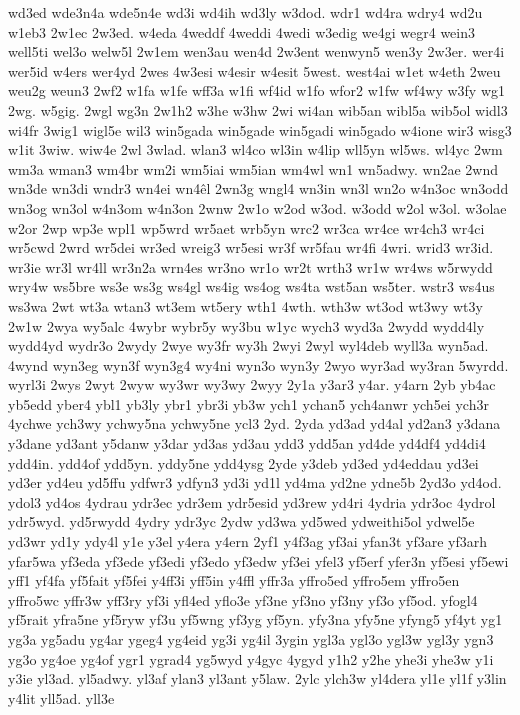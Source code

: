 {wd3ed
wde3n4a
wde5n4e
wd3i
wd4ih
wd3ly
w3dod.
wdr1
wd4ra
wdry4
wd2u
w1eb3
2w1ec
2w3ed.
w4eda
4weddf
4weddi
4wedi
w3edig
we4gi
wegr4
wein3
well5ti
wel3o
welw5l
2w1em
wen3au
wen4d
2w3ent
wenwyn5
wen3y
2w3er.
wer4i
wer5id
w4ers
wer4yd
2wes
4w3esi
w4esir
w4esit
5west.
west4ai
w1et
w4eth
2weu
weu2g
weun3
2wf2
w1fa
w1fe
wff3a
w1fi
wf4id
w1fo
wfor2
w1fw
wf4wy
w3fy
wg1
2wg.
w5gig.
2wgl
wg3n
2w1h2
w3he
w3hw
2wi
wi4an
wib5an
wibl5a
wib5ol
widl3
wi4fr
3wig1
wigl5e
wil3
win5gada
win5gade
win5gadi
win5gado
w4ione
wir3
wisg3
w1it
3wiw.
wiw4e
2wl
3wlad.
wlan3
wl4co
wl3in
w4lip
wll5yn
wl5ws.
wl4yc
2wm
wm3a
wman3
wm4br
wm2i
wm5iai
wm5ian
wm4wl
wn1
wn5adwy.
wn2ae
2wnd
wn3de
wn3di
wndr3
wn4ei
wn4êl
2wn3g
wngl4
wn3in
wn3l
wn2o
w4n3oc
wn3odd
wn3og
wn3ol
w4n3om
w4n3on
2wnw
2w1o
w2od
w3od.
w3odd
w2ol
w3ol.
w3olae
w2or
2wp
wp3e
wpl1
wp5wrd
wr5aet
wrb5yn
wrc2
wr3ca
wr4ce
wr4ch3
wr4ci
wr5cwd
2wrd
wr5dei
wr3ed
wreig3
wr5esi
wr3f
wr5fau
wr4fi
4wri.
wrid3
wr3id.
wr3ie
wr3l
wr4ll
wr3n2a
wrn4es
wr3no
wr1o
wr2t
wrth3
wr1w
wr4ws
w5rwydd
wry4w
ws5bre
ws3e
ws3g
ws4gl
ws4ig
ws4og
ws4ta
wst5an
ws5ter.
wstr3
ws4us
ws3wa
2wt
wt3a
wtan3
wt3em
wt5ery
wth1
4wth.
wth3w
wt3od
wt3wy
wt3y
2w1w
2wya
wy5alc
4wybr
wybr5y
wy3bu
w1yc
wych3
wyd3a
2wydd
wydd4ly
wydd4yd
wydr3o
2wydy
2wye
wy3fr
wy3h
2wyi
2wyl
wyl4deb
wyll3a
wyn5ad.
4wynd
wyn3eg
wyn3f
wyn3g4
wy4ni
wyn3o
wyn3y
2wyo
wyr3ad
wy3ran
5wyrdd.
wyrl3i
2wys
2wyt
2wyw
wy3wr
wy3wy
2wyy
2y1a
y3ar3
y4ar.
y4arn
2yb
yb4ac
yb5edd
yber4
ybl1
yb3ly
ybr1
ybr3i
yb3w
ych1
ychan5
ych4anwr
ych5ei
ych3r
4ychwe
ych3wy
ychwy5na
ychwy5ne
ycl3
2yd.
2yda
yd3ad
yd4al
yd2an3
y3dana
y3dane
yd3ant
y5danw
y3dar
yd3as
yd3au
ydd3
ydd5an
yd4de
yd4df4
yd4di4
ydd4in.
ydd4of
ydd5yn.
yddy5ne
ydd4ysg
2yde
y3deb
yd3ed
yd4eddau
yd3ei
yd3er
yd4eu
yd5ffu
ydfwr3
ydfyn3
yd3i
yd1l
yd4ma
yd2ne
ydne5b
2yd3o
yd4od.
ydol3
yd4os
4ydrau
ydr3ec
ydr3em
ydr5esid
yd3rew
yd4ri
4ydria
ydr3oc
4ydrol
ydr5wyd.
yd5rwydd
4ydry
ydr3yc
2ydw
yd3wa
yd5wed
ydweithi5ol
ydwel5e
yd3wr
yd1y
ydy4l
y1e
y3el
y4era
y4ern
2yf1
y4f3ag
yf3ai
yfan3t
yf3are
yf3arh
yfar5wa
yf3eda
yf3ede
yf3edi
yf3edo
yf3edw
yf3ei
yfel3
yf5erf
yfer3n
yf5esi
yf5ewi
yff1
yf4fa
yf5fait
yf5fei
y4ff3i
yff5in
y4ffl
yffr3a
yffro5ed
yffro5em
yffro5en
yffro5wc
yffr3w
yff3ry
yf3i
yfl4ed
yflo3e
yf3ne
yf3no
yf3ny
yf3o
yf5od.
yfogl4
yf5rait
yfra5ne
yf5ryw
yf3u
yf5wng
yf3yg
yf5yn.
yfy3na
yfy5ne
yfyng5
yf4yt
yg1
yg3a
yg5adu
yg4ar
ygeg4
yg4eid
yg3i
yg4il
3ygin
ygl3a
ygl3o
ygl3w
ygl3y
ygn3
yg3o
yg4oe
yg4of
ygr1
ygrad4
yg5wyd
y4gyc
4ygyd
y1h2
y2he
yhe3i
yhe3w
y1i
y3ie
yl3ad.
yl5adwy.
yl3af
ylan3
yl3ant
y5law.
2ylc
ylch3w
yl4dera
yl1e
yl1f
y3lin
y4lit
yll5ad.
yll3e
}

